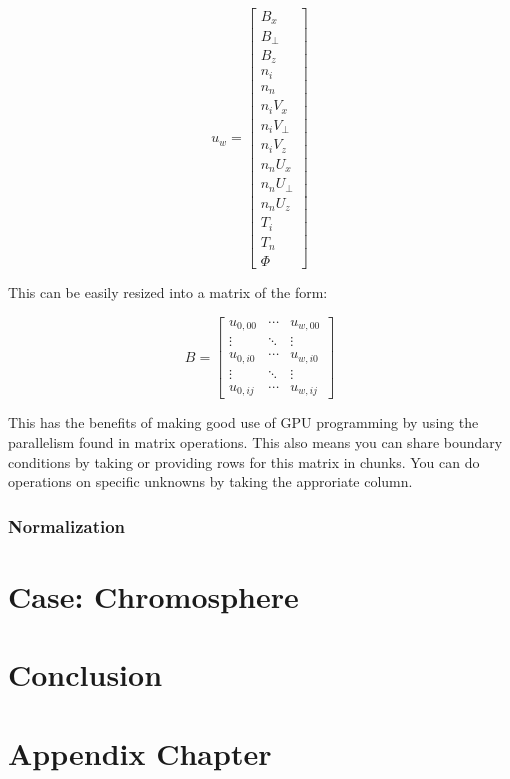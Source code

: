 \documentclass[12pt,upcase]{umlthesis}
\begin{document}
\begin{equation}
	u_w = 
	\begin{bmatrix}
		B_x \\
		B_{\perp} \\
		B_z \\
		n_i \\
		n_n \\
		n_i V_x \\
		n_i V_{\perp} \\
		n_i V_z \\
		n_n U_x \\
		n_n U_{\perp} \\
		n_n U_z \\
		T_i \\
		T_n \\
		\Phi
	\end{bmatrix}
\end{equation}

This can be easily resized into a matrix of the form:

\begin{equation}
	B =
	\begin{bmatrix}
		u_{0,00} & \cdots  & u_{w,00} \\
		\vdots   & \ddots & \vdots \\
		u_{0,i0} & \cdots & u_{w,i0} \\
		\vdots   & \ddots & \vdots \\
		u_{0,ij} & \cdots  & u_{w,ij}
	\end{bmatrix}
\end{equation}

This has the benefits of making good use of GPU programming by using the parallelism found in matrix operations. This also means you can share boundary conditions by taking or providing rows for this matrix in chunks. You can do operations on specific unknowns by taking the approriate column.

\subsection{Normalization}

\chapter{Case: Chromosphere}\label{chap:chromosphere} 

\chapter{Conclusion}\label{chap:conclusion}



\appendix
\chapter{Appendix Chapter}
\lipsum[2]
\end{document}
